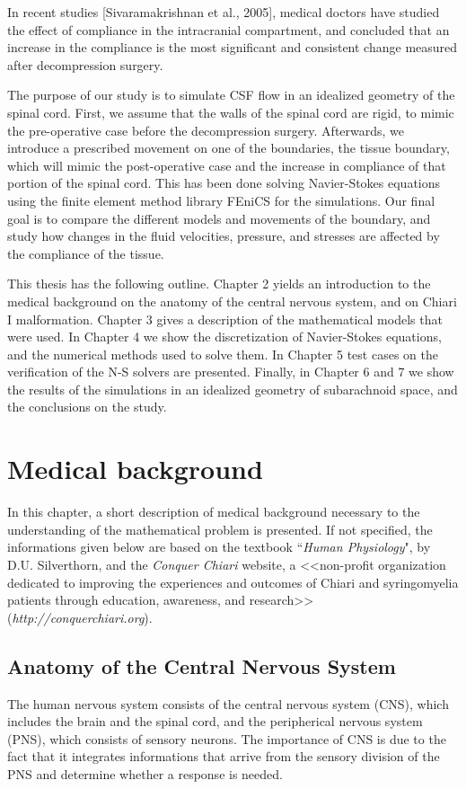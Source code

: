 \documentclass[a4paper,11pt,openright,twoside]{book}
\begin{document}
In recent studies [Sivaramakrishnan et al., 2005], medical doctors have studied the effect of compliance in the intracranial compartment, and concluded that an increase in the compliance is the most significant and consistent change measured after decompression surgery. 

The purpose of our study is to simulate CSF flow in an idealized geometry of the spinal cord. First, we assume that the walls of the spinal cord are rigid, to mimic the pre-operative case before the decompression surgery.  Afterwards, we introduce a prescribed movement on one of the boundaries, the tissue boundary, which will mimic the post-operative case and the increase in compliance of that portion of the spinal cord. This has been done solving Navier-Stokes equations using the finite element method library FEniCS for the simulations. Our final goal is to compare the different models and movements of the boundary, and study how changes in the fluid velocities, pressure, and stresses are affected by the compliance of the tissue. 

This thesis has the following outline. Chapter 2 yields an introduction to the medical background on the anatomy of the central nervous system, and on Chiari I malformation. Chapter 3 gives a description of the mathematical models that were used. In Chapter 4 we show the discretization of Navier-Stokes equations, and the numerical methods used to solve them. In Chapter 5 test cases on the verification of the N-S solvers are presented. Finally, in Chapter 6 and 7 we show the results of the simulations in an idealized geometry of subarachnoid space, and the conclusions on the study.

\chapter{Medical background}
In this chapter, a short description of medical background necessary to the understanding of the mathematical problem is presented. If not specified, the informations given below are based on the textbook ``\emph{Human Physiology}", by D.U. Silverthorn, and the \emph{Conquer Chiari} website, a <<non-profit organization dedicated to improving the experiences and outcomes of Chiari and syringomyelia patients through education, awareness, and research>>  (\emph{http://conquerchiari.org}).

\section{Anatomy of the Central Nervous System}
The human nervous system consists of the central nervous system (CNS), which includes the brain and the spinal cord, and the peripherical nervous system (PNS), which consists of sensory neurons.  The importance of CNS is due to the fact that it integrates informations that arrive from the sensory division of the PNS and determine whether a response is needed. 
\end{document}

